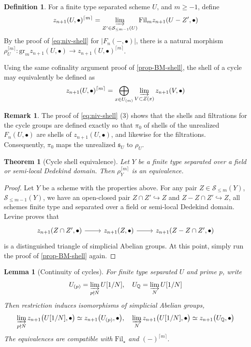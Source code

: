 \documentclass[11pt, twoside]{article}
\numberwithin{equation}{section}
\newtheorem{theorem}[equation]{Theorem}
\newtheorem{lemma}[equation]{Lemma}
\theoremstyle{definition}
\newtheorem{definition}[equation]{Definition}
\newtheorem{remark}[equation]{Remark}
\newcommand{\bb}[1]{\mathbb{#1}}
\newcommand{\colim}{\varinjlim}
\newcommand{\mf}[1]{\mathfrak{#1}}
\newcommand{\fil}{\mathrm{Fil}}
\newcommand{\gr}{\mathrm{gr}}
\begin{document}
\begin{definition}
For a finite type separated scheme \(U\), and \(m \geq -1\), define 
\[z_{n + 1}(U, \bullet)^{\lceil m \rceil} = \colim_{Z' \in \mathcal{S}_{\leq m - 1}(U)} \fil_m z_{n + 1}(U - Z', \bullet)\]
By the proof of \ref{eq:niv-shell} for \(|F_n( -, \bullet)|\), there is a natural morphism \(\rho_U^{\lceil m \rceil} \colon \gr_m  z_{n + 1}(U, \bullet) \to z_{n + 1}(U, \bullet)^{\lceil m \rceil}\).

Using the same cofinality argument proof of \ref{prop-BM-shell}, the shell of a cycle may equivalently be defined as 
\[z_{n + 1}(U, \bullet)^{\lceil m \rceil} = \bigoplus_{x \in U_{(m)}} \colim_{V \subset Z(x)} z_{n + 1}(V, \bullet)\]
\end{definition}

\begin{remark}\label{rem:shell-cyc-spc}
The proof of \ref{eq:niv-shell} (3) shows that the shells and filtrations for the cycle groups are defined exactly so that \(\pi_0\) of shells of the unrealized \(F_n(U, \bullet)\) are shells of \(z_{n + 1}(U, \bullet)\), and likewise for the filtrations. Consequently, \(\pi_0\) maps the unrealized \(\mf{s}_U\) to \(\rho_U\).
\end{remark}

\begin{theorem}[Cycle shell equivalence]\label{thm:cyc-shell-gr}
Let \(Y\) be a finite type separated over a field or semi-local Dedekind domain. Then \(\rho_Y^{\lceil m \rceil}\) is an equivalence.
\end{theorem}

\begin{proof}
Let \(Y\) be a scheme with the properties above. For any pair \(Z \in \mathcal{S}_{\leq m}(Y)\), \(\mathcal{S}_{\leq m - 1}(Y)\), we have an open-closed pair \(Z \cap Z' \hookrightarrow Z\) and \(Z - Z \cap Z' \hookrightarrow Z\), all schemes finite type and separated over a field or semi-local Dedekind domain. Levine \cite[Theorem 1.7]{LevTechLoc} proves that 
\[\begin{tikzcd} 
z_{n + 1}(Z \cap Z', \bullet) \ar[r] & z_{n + 1}(Z, \bullet) \ar[r] & z_{n + 1}(Z - Z \cap Z', \bullet)
\end{tikzcd}\]
is a distinguished triangle of simplicial Abelian groups. At this point, simply run the proof of \ref{prop-BM-shell} again.
\end{proof}

\begin{lemma}[Continuity of cycles]
For finite type separated \(U\) and prime \(p\), write 
\[U_{(p)} = \colim_{p \nmid N} U[1/N], \quad U_\bb{Q} = \colim_N U[1/N]\]
Then restriction induces isomorphisms of simplicial Abelian groups, 
\begin{equation}\label{eq:cyc-cont}
\colim_{p \nmid N}  z_{n + 1} \big(U[1/N], \bullet \big) \simeq z_{n + 1}\big(U_{(p)}, \bullet\big), \quad \colim_N z_{n + 1} \big(U[1/N], \bullet \big) \simeq z_{n + 1}\big(U_\bb{Q}, \bullet\big)
\end{equation}
The equivalences are compatible with \(\fil_\star\) and \(( - )^{\lceil m \rceil}\).
\end{lemma}
\end{document}
